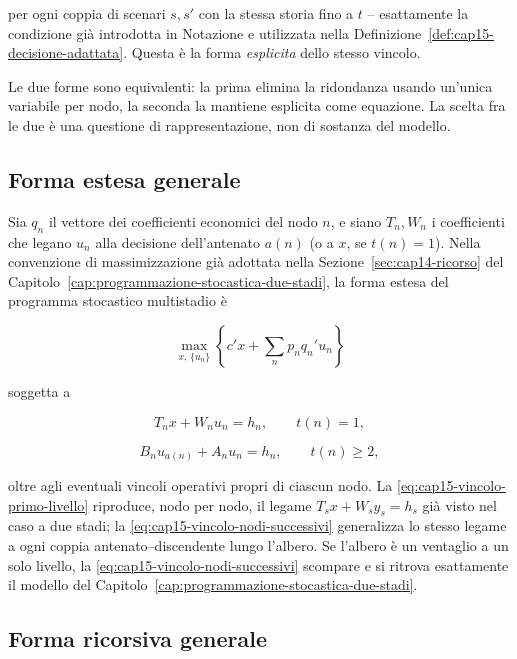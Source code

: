 per ogni coppia di scenari $s,s'$ con la stessa storia fino a $t$ --
esattamente la condizione gi\`a introdotta in Notazione e utilizzata nella
Definizione~\ref{def:cap15-decisione-adattata}. Questa \`e la forma
\emph{esplicita} dello stesso vincolo.

Le due forme sono equivalenti: la prima elimina la ridondanza usando
un'unica variabile per nodo, la seconda la mantiene esplicita come equazione.
La scelta fra le due \`e una questione di rappresentazione, non di
sostanza del modello.

\subsection{Forma estesa generale}

Sia $q_n$ il vettore dei coefficienti economici del nodo $n$, e siano
$T_n,W_n$ i coefficienti che legano $u_n$ alla decisione dell'antenato $a(n)$
(o a $x$, se $t(n)=1$). Nella convenzione di massimizzazione gi\`a adottata
nella Sezione~\ref{sec:cap14-ricorso} del
Capitolo~\ref{cap:programmazione-stocastica-due-stadi}, la forma estesa del
programma stocastico multistadio \`e

\begin{equation}
\max_{x,\,\{u_n\}}
\left\{
c'x
+
\sum_{n}p_nq_n'u_n
\right\}
\label{eq:cap15-obiettivo-multistadio}
\end{equation}

soggetta a

\begin{equation}
T_nx+W_nu_n=h_n,
\qquad
t(n)=1,
\label{eq:cap15-vincolo-primo-livello}
\end{equation}

\begin{equation}
B_nu_{a(n)}+A_nu_n=h_n,
\qquad
t(n)\geq2,
\label{eq:cap15-vincolo-nodi-successivi}
\end{equation}

oltre agli eventuali vincoli operativi propri di ciascun nodo. La
\eqref{eq:cap15-vincolo-primo-livello} riproduce, nodo per nodo, il legame
$T_sx+W_sy_s=h_s$ gi\`a visto nel caso a due stadi; la
\eqref{eq:cap15-vincolo-nodi-successivi} generalizza lo stesso legame a
ogni coppia antenato--discendente lungo l'albero. Se l'albero \`e un
ventaglio a un solo livello, la \eqref{eq:cap15-vincolo-nodi-successivi}
scompare e si ritrova esattamente il modello del
Capitolo~\ref{cap:programmazione-stocastica-due-stadi}.

\subsection{Forma ricorsiva generale}

